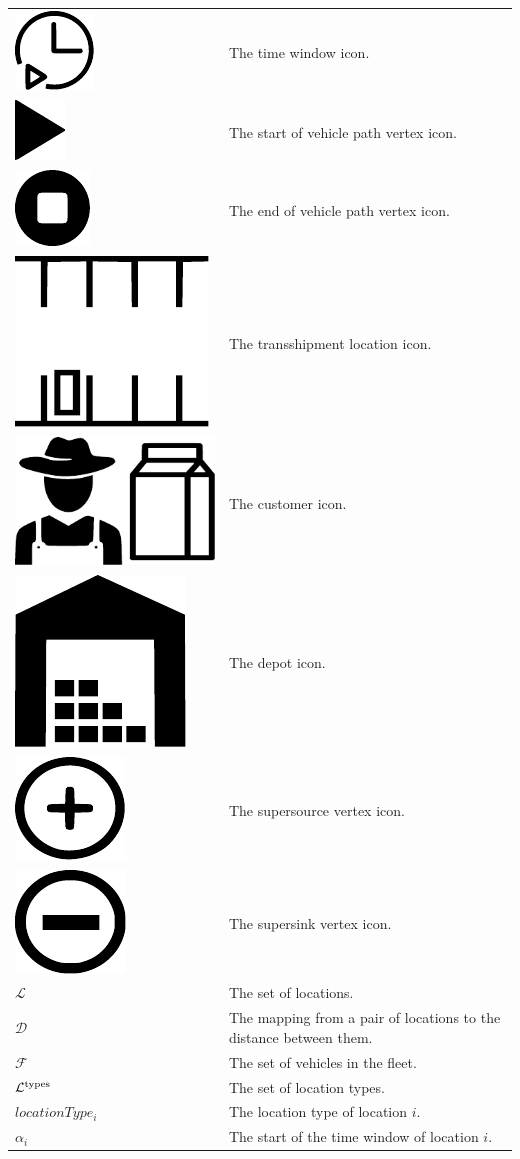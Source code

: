 \begin{longtable}{ll}
\includegraphics[width=.04\textwidth]{img/time-window_icon.pdf} & The time window icon. \\
\includegraphics[width=.04\textwidth]{img/vehicle_start.pdf} & The start of vehicle path vertex icon. \\
\includegraphics[width=.04\textwidth]{img/vehicle_end.pdf} & The end of vehicle path vertex icon.\\
\includegraphics[width=.04\textwidth]{img/transshipment_location_icon.pdf} & The transshipment location icon.\\
\includegraphics[width=.04\textwidth]{img/customer_location_icon.pdf} & The customer icon. \\
\includegraphics[width=.04\textwidth]{img/depot_location_icon.pdf} & The depot icon.\\
\includegraphics[width=.04\textwidth]{img/super_source_icon.pdf} & The supersource vertex icon. \\
\includegraphics[width=.04\textwidth]{img/super_sink_icon.pdf} & The supersink vertex icon.\\
$\mathcal L$ & The set of locations. \\
$\mathcal D$ & The mapping from a pair of locations to the distance between them. \\
$\mathcal F$ & The set of vehicles in the fleet. \\
$\mathcal L^{\rm types}$ & The set of location types. \\
$locationType_i$ & The location type of location $i$. \\
$\alpha_i$ & The start of the time window of location $i$. \\

\end{longtable}

